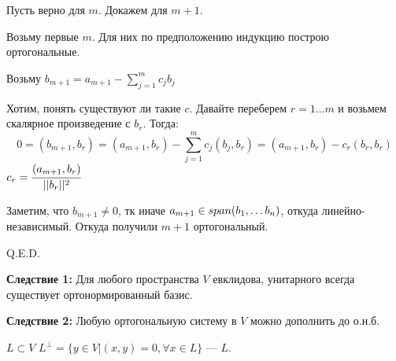 Пусть верно для $m$. Докажем для $m+1$.

Возьму первые $m$. Для них по предположению индукцию построю ортогональные.

Возьму $b_{m+1}=a_{m+1} - \sum\limits_{j=1}^m c_j b_j$

Хотим, понять существуют ли такие $c$. Давайте переберем $r = 1\ldots m $ и возьмем скалярное произведение с $b_r$. Тогда:
$$0 = (b_{m+1}, b_r) = (a_{m+1},b_r)-\sum\limits_{j=1}^m c_j(b_j,b_r) = (a_{m+1},b_r)-c_r(b_r,b_r)$$
$c_r = \cfrac{(a_{m+1}, b_r)}{||b_r||^2}$

Заметим, что $b_{m+1}\neq 0$, тк иначе $a_{m+1}\in span(b_1,\ldots b_n)$, откуда линейно-независимый. Откуда получили $m+1$ ортогональный.

\hfill Q.E.D.

\textbf{Следствие 1:} Для любого пространства $V$ евклидова, унитарного всегда существует ортонормированный базис.

\textbf{Следствие 2:} Любую ортогональную систему в $V$ можно дополнить до о.н.б.

 $L \subset V$ $L^{\perp} = \{y \in V | (x,y)=0, \forall x \in L\}$
---  $L$.

